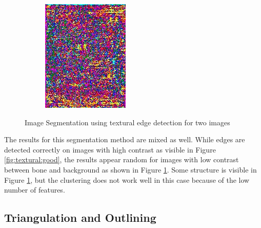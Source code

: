 \documentclass[pdftex,12pt,a4paper]{report}
\begin{document}
\begin{figure}[h]
\begin{subfigure}[b]{0.24\textwidth}
		\subcaption{}
		\label{fig:textural:bad}
	\end{subfigure}
	\begin{subfigure}[b]{0.24\textwidth}
		\centering
		\includegraphics[width=.9\linewidth]{img/segmentation/bad/textural-edges/segmented.jpg}
		\subcaption*{}
		\label{}
	\end{subfigure}
	\caption{Image Segmentation using textural edge detection for two images}
	\label{fig:textural}
\end{figure}

The results for this segmentation method are mixed as well. While edges are detected correctly on images with high contrast as visible in Figure \ref{fig:textural:good}, the results appear random for images with low contrast between bone and background as shown in Figure \ref{fig:textural:bad}. Some structure is visible in Figure \ref{fig:textural:bad}, but the clustering does not work well in this case because of the low number of features.

\subsection{Triangulation and Outlining}
\end{document}
